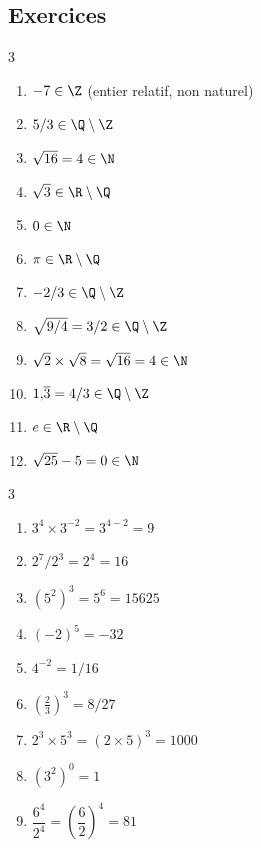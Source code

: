 
\subsection*{Exercices}


\begin{multicols}{3}
\begin{enumerate}
  \item $-7\in\Z$ (entier relatif, non naturel)
  \item $5/3\in\Q\setminus\Z$
  \item $\sqrt{16}=4\in\N$
  \item $\sqrt{3}\in\R\setminus\Q$
  \item $0\in\N$
  \item $\pi\in\R\setminus\Q$
  \item $-2/3\in\Q\setminus\Z$
  \item $\sqrt{9/4}=3/2\in\Q\setminus\Z$
  \item $\sqrt{2}\times\sqrt{8}=\sqrt{16}=4\in\N$
  \item $1{,}\overline{3}=4/3\in\Q\setminus\Z$
  \item $e\in\R\setminus\Q$
  \item $\sqrt{25}-5=0\in\N$
\end{enumerate}
\end{multicols}


\begin{multicols}{3}
\begin{enumerate}
  \item $3^4\times3^{-2}=3^{4-2}=9$
  \item $2^7/2^3=2^4=16$
  \item $(5^2)^3=5^6=15625$
  \item $(-2)^5=-32$
  \item $4^{-2}=1/16$
  \item $\left(\tfrac{2}{3}\right)^3=8/27$
  \item $2^3\times5^3=(2\times5)^3=1000$
  \item $(3^2)^0=1$
  \item $\dfrac{6^4}{2^4}=\left(\dfrac{6}{2}\right)^4=81$
\end{enumerate}
\end{multicols}

